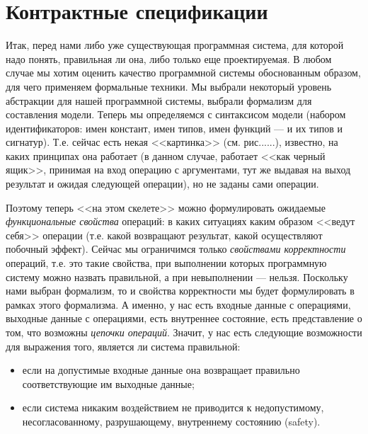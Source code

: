 \documentclass[14pt, twoside]{extreport}
\begin{document}
\chapter{Контрактные спецификации}




Итак, перед нами либо уже существующая программная система, для которой надо понять, правильная ли она, либо только еще проектируемая. В любом случае мы хотим оценить качество программной системы обоснованным образом, для чего применяем формальные техники. Мы выбрали некоторый уровень абстракции для нашей программной системы, выбрали формализм для составления модели. Теперь мы определяемся с синтаксисом модели (набором идентификаторов: имен констант, имен типов, имен функций --- и их типов и сигнатур). Т.е. сейчас есть некая <<картинка>> (см. рис......), известно, на каких принципах она работает (в данном случае, работает <<как черный ящик>>, принимая на вход операцию с аргументами, тут же выдавая на выход результат и ожидая следующей операции), но не заданы сами операции.

Поэтому теперь <<на этом скелете>> можно формулировать ожидаемые \emph{функциональные свойства} операций: в каких ситуациях каким образом <<ведут себя>> операции (т.е. какой возвращают результат, какой осуществляют побочный эффект). Сейчас мы ограничимся только \emph{свойствами корректности} операций, т.е. это такие свойства, при выполнении которых программную систему можно назвать правильной, а при невыполнении --- нельзя. Поскольку нами выбран формализм, то и свойства корректности мы будет формулировать в рамках этого формализма. А именно, у нас есть входные данные с операциями, выходные данные с операциями, есть внутреннее состояние, есть представление о том, что возможны \emph{цепочки операций}. Значит, у нас есть следующие возможности для выражения того, является ли система правильной:
\begin{itemize}
\item если на допустимые входные данные она возвращает правильно соответствующие им выходные данные;
\item если система никаким воздействием не приводится к недопустимому, несогласованному, разрушающему, внутреннему состоянию (safety).
\end{itemize}
\end{document}
